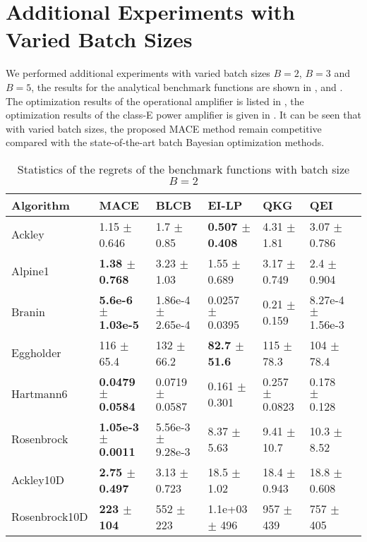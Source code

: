 \section{Additional Experiments with Varied Batch Sizes}

We performed additional experiments with varied batch sizes $B = 2$, $B = 3$
and $B = 5$, the results for the analytical benchmark functions are shown in ,
 and . The
optimization results of the operational amplifier is listed in
, the optimization results of the class-E power
amplifier is given in . It can be seen that with
varied batch sizes, the proposed MACE method remain competitive compared with
the state-of-the-art batch Bayesian optimization methods.

\begin{table*}[!htb]
    \centering
    \caption{Statistics of the regrets of the benchmark functions with batch size $B=2$}
    \label{tab:result_analytical_b2}
    \begin{tabular}{lllllll}
        \toprule
        Algorithm     & MACE                                   & BLCB                       & EI-LP                        & QKG                    & QEI                              \\ 
        \midrule
        Ackley        & 1.15             $\pm$  0.646    &  1.7       $\pm$  0.85      &  \textbf{0.507  $\pm$ 0.408}   &  4.31   $\pm$  1.81    &  3.07      $\pm$  0.786    \\
        Alpine1       & \textbf{1.38     $\pm$  0.768}   &  3.23      $\pm$  1.03      &  1.55           $\pm$ 0.689    &  3.17   $\pm$  0.749   &  2.4       $\pm$  0.904    \\
        Branin        & \textbf{5.6e-6   $\pm$  1.03e-5} &  1.86e-4   $\pm$  2.65e-4   &  0.0257         $\pm$ 0.0395   &  0.21   $\pm$  0.159   &  8.27e-4   $\pm$  1.56e-3  \\
        Eggholder     & 116              $\pm$  65.4     &  132       $\pm$  66.2      &  \textbf{82.7   $\pm$ 51.6}    &  115    $\pm$  78.3    &  104       $\pm$  78.4     \\
        Hartmann6     & \textbf{0.0479   $\pm$  0.0584}  &  0.0719    $\pm$  0.0587    &  0.161          $\pm$ 0.301    &  0.257  $\pm$  0.0823  &  0.178     $\pm$  0.128    \\
        Rosenbrock    & \textbf{1.05e-3  $\pm$  0.0011}  &  5.56e-3   $\pm$  9.28e-3   &  8.37           $\pm$ 5.63     &  9.41   $\pm$  10.7    &  10.3      $\pm$  8.52     \\
        Ackley10D     & \textbf{2.75     $\pm$  0.497}   &  3.13      $\pm$  0.723     &  18.5           $\pm$ 1.02     &  18.4   $\pm$  0.943   &  18.8      $\pm$  0.608    \\
        Rosenbrock10D & \textbf{223      $\pm$  104}     &  552       $\pm$  223       &  1.1e+03        $\pm$ 496      &  957    $\pm$  439     &  757       $\pm$  405      \\
        \bottomrule
    \end{tabular}
\end{table*}

